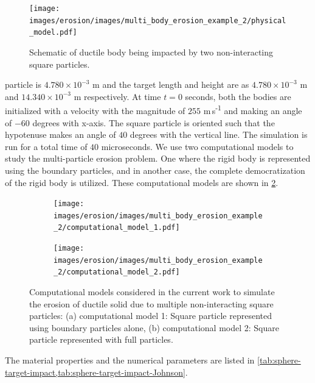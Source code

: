 \begin{figure}[!htpb]
  \centering
  \texttt{[image: images/erosion/images/multi\_body\_erosion\_example\_2/physical\_model.pdf]}
  \caption{Schematic of ductile body being impacted by two non-interacting
    square particles.}
\label{fig:mpe-2-pm}
\end{figure}
particle is $4.780 \times 10^{-3}$ m and the target length and height are as
$4.780 \times 10^{-3}$ m and $14.340 \times 10^{-3}$ m respectively. At time
$t=0$ seconds, both the bodies are initialized with a velocity with the magnitude of
$255$ m\,s\textsuperscript{-1} and making an angle of $-60$ degrees with x-axis.
The square particle is oriented such that the hypotenuse makes an angle of $40$
degrees with the vertical line. The simulation is run for a total time of $40$
microseconds. We use two computational models to study the multi-particle
erosion problem. One where the rigid body is represented using the boundary
particles, and in another case, the complete democratization of the rigid body
is utilized. These computational models are shown in
\cref{fig:mpe-2-cm}.
\begin{figure}[!htpb]
  \centering
  \begin{subfigure}{0.48\textwidth}
    \centering
    \texttt{[image: images/erosion/images/multi\_body\_erosion\_example\_2/computational\_model\_1.pdf]}
    \subcaption{}
  \end{subfigure}
  \begin{subfigure}{0.48\textwidth}
    \centering
    \texttt{[image: images/erosion/images/multi\_body\_erosion\_example\_2/computational\_model\_2.pdf]}
    \subcaption{}
  \end{subfigure}
  \caption{Computational models considered in the current work to simulate the
    erosion of ductile solid due to multiple non-interacting square particles:
    (a) computational model 1: Square particle represented using boundary particles alone,
    (b) computational model 2: Square particle represented with full particles.}
\label{fig:mpe-2-cm}
\end{figure}
The material properties and the numerical parameters are listed in
\cref{tab:sphere-target-impact,tab:sphere-target-impact-Johnson}.
